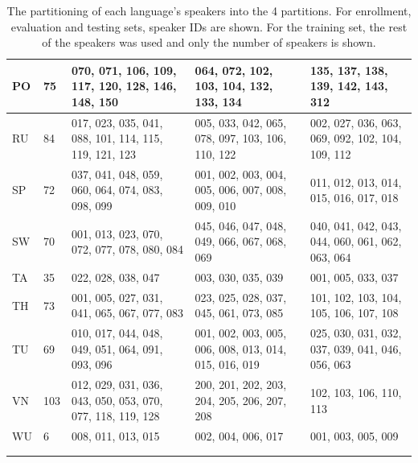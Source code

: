 \documentclass[bsc,frontabs,twoside,singlespacing,parskip,deptreport]{infthesis}
\begin{document}
{\begin{sc}
\begin{longtable}{p{0.5cm}|p{0.8cm}|p{3.9cm}|p{3.5cm}|p{3.5cm}}
      \hline
      PO & 75 & 070, 071, 106, 109, 117, 120, 128, 146, 148, 150 & 064, 072, 102, 103, 104, 132, 133, 134 & 135, 137, 138, 139, 142, 143, 312 \\
      \hline
      RU & 84 & 017, 023, 035, 041, 088, 101, 114, 115, 119, 121, 123 & 005, 033, 042, 065, 078, 097, 103, 106, 110, 122 & 002, 027, 036, 063, 069, 092, 102, 104, 109, 112 \\
      \hline
      SP & 72 & 037, 041, 048, 059, 060, 064, 074, 083, 098, 099 & 001, 002, 003, 004, 005, 006, 007, 008, 009, 010 & 011, 012, 013, 014, 015, 016, 017, 018 \\
      \hline
      SW & 70 & 001, 013, 023, 070, 072, 077, 078, 080, 084 & 045, 046, 047, 048, 049, 066, 067, 068, 069 & 040, 041, 042, 043, 044, 060, 061, 062, 063, 064 \\
      \hline
      TA & 35 & 022, 028, 038, 047 & 003, 030, 035, 039 & 001, 005, 033, 037 \\
      \hline
      TH & 73 & 001, 005, 027, 031, 041, 065, 067, 077, 083 & 023, 025, 028, 037, 045, 061, 073, 085 & 101, 102, 103, 104, 105, 106, 107, 108 \\
      \hline
      TU & 69 & 010, 017, 044, 048, 049, 051, 064, 091, 093, 096 & 001, 002, 003, 005, 006, 008, 013, 014, 015, 016, 019 & 025, 030, 031, 032, 037, 039, 041, 046, 056, 063 \\
      \hline
      VN & 103 & 012, 029, 031, 036, 043, 050, 053, 070, 077, 118, 119, 128 & 200, 201, 202, 203, 204, 205, 206, 207, 208 & 102, 103, 106, 110, 113 \\
      \hline
      WU & 6 & 008, 011, 013, 015 & 002, 004, 006, 017 & 001, 003, 005, 009 \\
      \hline
      \multicolumn{3}{l}{} \\[-7pt]
      \caption{The partitioning of each language's speakers into the 4 partitions. For enrollment, evaluation and testing sets, speaker IDs are shown. For the training set, the rest of the speakers was used and only the number of speakers is shown.}
      \label{tab:partitioning}
    \end{longtable}
  \end{sc}
}
\end{document}
